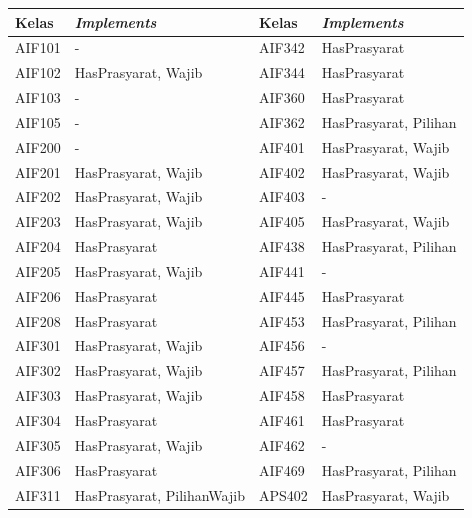\begin{enumerate}
\begin{table}[H]
	\centering
    \begin{tabular}{|p{2.5cm}|p{4.5cm}|p{2.5cm}|p{4.5cm}|}
		\hline
		Kelas & \textit{Implements} & Kelas & \textit{Implements}\\
		\hline
    AIF101  & - &    AIF342  & HasPrasyarat               \\
    AIF102  & HasPrasyarat, Wajib        &    AIF344  & HasPrasyarat               \\
    AIF103  & -                          &    AIF360  & HasPrasyarat               \\
    AIF105  & -                          &    AIF362  & HasPrasyarat, Pilihan      \\
    AIF200  & -                          &    AIF401  & HasPrasyarat, Wajib        \\
    AIF201  & HasPrasyarat, Wajib        &    AIF402  & HasPrasyarat, Wajib        \\
    AIF202  & HasPrasyarat, Wajib        &    AIF403  & -                          \\
    AIF203  & HasPrasyarat, Wajib        &    AIF405  & HasPrasyarat, Wajib        \\
    AIF204  & HasPrasyarat               &    AIF438  & HasPrasyarat, Pilihan      \\
    AIF205  & HasPrasyarat, Wajib        &    AIF441  & -                          \\
    AIF206  & HasPrasyarat               &    AIF445  & HasPrasyarat               \\
    AIF208  & HasPrasyarat               &    AIF453  & HasPrasyarat, Pilihan      \\
    AIF301  & HasPrasyarat, Wajib        &    AIF456  & -                          \\
    AIF302  & HasPrasyarat, Wajib        &    AIF457  & HasPrasyarat, Pilihan      \\
    AIF303  & HasPrasyarat, Wajib        &    AIF458  & HasPrasyarat               \\
    AIF304  & HasPrasyarat               &    AIF461  & HasPrasyarat               \\
    AIF305  & HasPrasyarat, Wajib        &    AIF462  & -                          \\
    AIF306  & HasPrasyarat               &    AIF469  & HasPrasyarat, Pilihan      \\
    AIF311  & HasPrasyarat, PilihanWajib &    APS402  & HasPrasyarat, Wajib        \\

\end{tabular}
\end{table}
\end{enumerate}
